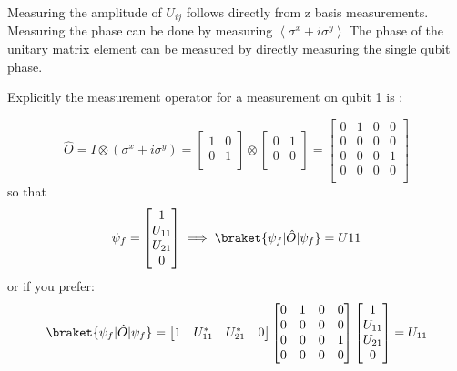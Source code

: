 Measuring the amplitude of $U_{ij}$ follows directly from z basis measurements.
Measuring the phase can be done by measuring $\left< \sigma^{x} + i\sigma^{y} \right>$
The phase of the unitary matrix element can be measured by directly measuring the single qubit phase.

Explicitly the measurement operator for a measurement on qubit 1 is :

\begin{equation}
    \hat{O}=I \otimes (\sigma^{x} + i\sigma^{y}) =
    \begin{bmatrix}
        1 & 0\\
        0 & 1\\
    \end{bmatrix}
    \otimes
    \begin{bmatrix}
        0 & 1\\
        0 & 0\\
    \end{bmatrix}=
    \begin{bmatrix}
        0 & 1 & 0 & 0\\
        0 & 0 & 0 & 0\\
        0 & 0 & 0 & 1\\
        0 & 0 & 0 & 0\\
    \end{bmatrix}
\end{equation}
so that
\begin{equation}
    \psi_{f}=
    \begin{bmatrix}
        1 \\
        U_{11} \\
        U_{21} \\
        0 \\
    \end{bmatrix}
    \implies
    \braket{\psi_{f}|\hat{O}|\psi_{f}} = U11
\end{equation}
or if you prefer:
\begin{equation}
    \braket{\psi_{f}|\hat{O}|\psi_{f}} =
    \begin{bmatrix}
        1 & U_{11}^{*} & U_{21}^{*} & 0
    \end{bmatrix}
    \begin{bmatrix}
        0 & 1 & 0 & 0\\
        0 & 0 & 0 & 0\\
        0 & 0 & 0 & 1\\
        0 & 0 & 0 & 0\\
    \end{bmatrix}
    \begin{bmatrix}
        1 \\
        U_{11} \\
        U_{21} \\
        0 \\
    \end{bmatrix}
    = U_{11}
\end{equation}


